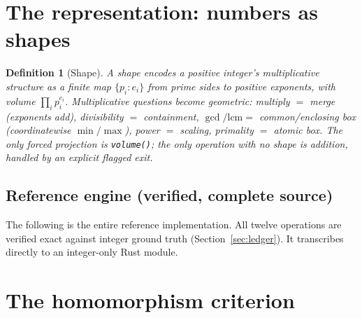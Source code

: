 \documentclass[11pt]{article}
\newtheorem{definition}{Definition}[section]
\begin{document}
\section{The representation: numbers as shapes}

\begin{definition}[Shape]
A \emph{shape} encodes a positive integer's multiplicative structure as a finite map $\{p_i:e_i\}$ from prime
sides to positive exponents, with volume $\prod_i p_i^{e_i}$. Multiplicative questions become geometric:
multiply $=$ merge (exponents add), divisibility $=$ containment, $\gcd/\mathrm{lcm}=$ common/enclosing box
(coordinatewise $\min/\max$), power $=$ scaling, primality $=$ atomic box. The only forced projection is
\texttt{volume()}; the only operation with no shape is addition, handled by an explicit flagged exit.
\end{definition}

\subsection{Reference engine (verified, complete source)}
The following is the entire reference implementation. All twelve operations are verified exact against
integer ground truth (Section~\ref{sec:ledger}). It transcribes directly to an integer-only Rust module.



\section{The homomorphism criterion}
\end{document}
